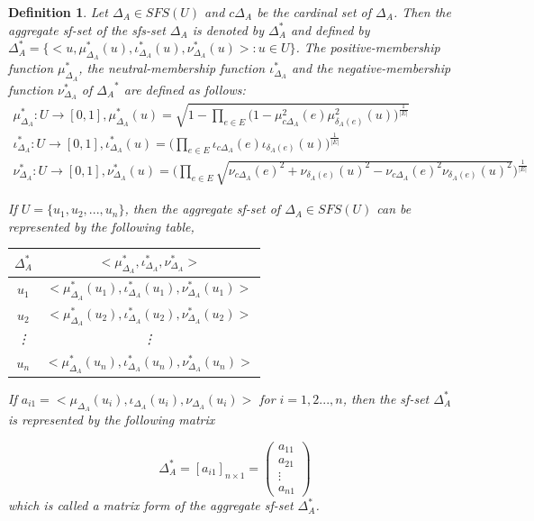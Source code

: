 \documentclass{IJFS}
\newtheorem{definition}[theorem]{Definition}
\begin{document}
\begin{definition} Let $\Delta_A\in SFS(U)$ and $c\Delta_A$ be the cardinal set of
$\Delta_A$. Then the aggregate sf-set of the sfs-set $\Delta_A$ is
denoted by $\Delta_A^*$ and defined by
$\Delta_A^*=\{<u,\mu_{\Delta_A}^*(u), \iota_{\Delta_A}^*(u),
\nu_{\Delta_A}^*(u)>: u\in U\}$. The positive-membership function
$\mu_{\Delta_A}^*$, the neutral-membership function
$\iota_{\Delta_A}^*$ and the negative-membership function
$\nu_{\Delta_A}^*$ of ${\Delta_A}^*$ are defined as follows:
\begin{eqnarray}
\mu_{\Delta_A}^*:U\to[0,1],
\mu_{\Delta_A}^*(u)=\sqrt{1-\prod_{e\in E}
\bigg(1-\mu_{c\Delta_A}^2(e)\mu_{\delta_A(e)}^2(u)\bigg)^{\frac{1}{|E|}}}\\
\iota_{\Delta_A}^*:U\to[0,1],
\iota_{\Delta_A}^*(u)=\Big(\prod_{e\in E}
\iota_{c\Delta_A}(e)\iota_{\delta_A(e)}(u)\Big)^{\frac{1}{|E|}}\\
\nu_{\Delta_A}^*:U\to[0,1], \nu_{\Delta_A}^*(u)=\Big(\prod_{e\in
E}
\sqrt{{\nu_{c\Delta_A}(e)}^2+{\nu_{\delta_A(e)}(u)}^2-{\nu_{c\Delta_A}(e)}^2{\nu_{\delta_A(e)}(u)}^2}\Big)^{\frac{1}{|E|}}
\end{eqnarray}

If $U=\{u_1, u_2, ..., u_n\}$, then the aggregate sf-set of
$\Delta_A\in SFS(U)$ can be represented by the following table,
\begin{table}[!h]
\begin{center}
\begin{tabular}{c|c} \hline
$\Delta_A^*$  &$<\mu_{\Delta_A}^*, \iota_{\Delta_A}^*,
\nu_{\Delta_A}^*>$ \\
\hline $u_1$& $<\mu_{\Delta_A}^*(u_1), \iota_{\Delta_A}^*(u_1),
\nu_{\Delta_A}^*(u_1)>$\\  $u_2$ &$<\mu_{\Delta_A}^*(u_2),
\iota_{\Delta_A}^*(u_2),
\nu_{\Delta_A}^*(u_2)>$\\
 \vdots & \vdots\\  $u_n$ &$<\mu_{\Delta_A}^*(u_n), \iota_{\Delta_A}^*(u_n),
\nu_{\Delta_A}^*(u_n)>$
\end{tabular}\end{center}
\end{table}

If $a_{i1}=<\mu_{\Delta_A}(u_i), \iota_{\Delta_A}(u_i),
\nu_{\Delta_A}(u_i)> $ for $i=1,2...,n$, then the sf-set
$\Delta_A^*$ is represented by the following matrix

\begin{equation}
\Delta_A^*=[a_{i1}]_{n\times 1}=\left(
\begin{array}{c}
a_{11}  \\
a_{21} \\
\vdots \\
a_{n1}
\end{array} \right)
\end{equation}
which is called a  matrix form of the  aggregate sf-set
$\Delta_A^*$.



\end{definition}
\end{document}
